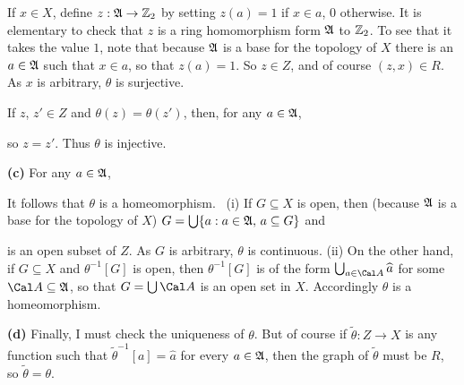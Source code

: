 {\medskip 
 
 If $x\in X$, define $z:\frak A\to\Bbb Z_2$ by setting 
$z(a)=1$ if $x\in a$, $0$ otherwise. 
It is elementary to check that $z$ is a ring homomorphism 
form $\frak A$ to $\Bbb Z_2$.    To see that it takes the value $1$, 
note that because $\frak A$ is a base for the topology of $X$ there 
is an $a\in\frak A$ such that $x\in a$, so that $z(a)=1$. 
So $z\in Z$, and of course $(z,x)\in R$.   As $x$ is arbitrary, $\theta$ 
is surjective. 
 
\medskip 
 
 If $z$, $z'\in Z$ and $\theta(z)=\theta(z')$, then, for 
any $a\in\frak A$, 
 
 
\noindent so $z=z'$.   Thus $\theta$ is injective.\ \Qed 
 
\medskip 
 
{\bf (c)} For any $a\in\frak A$, 
 
 
\noindent It follows that $\theta$ is a homeomorphism.   \Prf\ (i) If 
$G\subseteq X$ is open, then (because $\frak A$ is a base for the 
topology of $X$) $G=\bigcup\{a:a\in\frak A,\,a\subseteq G\}$ and 
 
 
\noindent is an open subset of $Z$.   As $G$ is arbitrary, $\theta$ is 
continuous.   (ii) On the other hand, if $G\subseteq X$ and 
$\theta^{-1}[G]$ is open, then $\theta^{-1}[G]$ is of the form 
$\bigcup_{a\in\Cal A}\widehat{a}$ for some $\Cal A\subseteq\frak A$, so 
that $G=\bigcup\Cal A$ is an open set in $X$.   Accordingly $\theta$ is 
a homeomorphism.\ \Qed 
 
\medskip 
 
{\bf (d)} Finally, I must check the uniqueness of $\theta$. 
But of course if $\tilde\theta:Z\to X$ is any function such that 
$\tilde\theta^{-1}[a]=\widehat{a}$ for every $a\in\frak A$, then the 
graph of $\tilde\theta$ must be $R$, so $\tilde\theta=\theta$. 
}%
 
 
